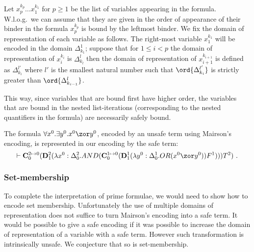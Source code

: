 Let $x^{k_p}_p \ldots x^{k_1}_1$ for $p\geq1$ be the list of variables appearing in the formula. W.l.o.g.\ we can assume that they are given in the order of appearance of their binder in the formula \ie $x^{k_p}_p$ is bound by the leftmost binder. We fix the domain of representation of each variable as follows. The right-most variable $x^{k_1}_1$ will be encoded in the domain $\Delta^1_{k_1}$; suppose that for $1\leq i< p$ the domain of representation of $x^{k_i}_i$ is $\Delta^l_{k_l}$ then the domain of representation of $x^{k_{i+1}}_{i+1}$ is defined as
$\Delta^{l'}_{k_i}$ where $l'$ is the smallest natural number such that $\ord{\Delta^{l'}_{k_i}}$ is strictly greater than $\ord{\Delta^{l}_{k_{i-1}}}$.

This way, since variables that are bound first have higher order, the variables that are bound in the nested list-iterations (corresponding to the nested quantifiers in the formula) are necessarily safely bound.

\begin{example}
The formula  $\forall x^0 . \exists y^0 . x^0 \zor y^0$, encoded by an unsafe term using Mairson's encoding, is represented in our encoding by the safe term:
 $$\vdash \mathbf{C}_0^{2\mapsto 0}(\mathbf{D}_1^2 (\lambda x^0:\Delta_0^2. AND (\mathbf{C}_0^{1\mapsto 0} (\mathbf{D}_1^1 (\lambda y^0:\Delta_0^1. OR (x^0 \zor y^0)) F^1))) T^2 )\ .$$
\end{example}


\subsubsection{Set-membership}
To complete the interpretation of prime formulae, we would need to show how to encode set membership. Unfortunately the use of multiple domains of representation does not suffice to turn Mairson's encoding into a safe term. It would  be possible to give a safe encoding if it was possible to increase the domain of representation of a variable with a safe term. However such transformation is intrinsically unsafe. We conjecture that so is set-membership.



